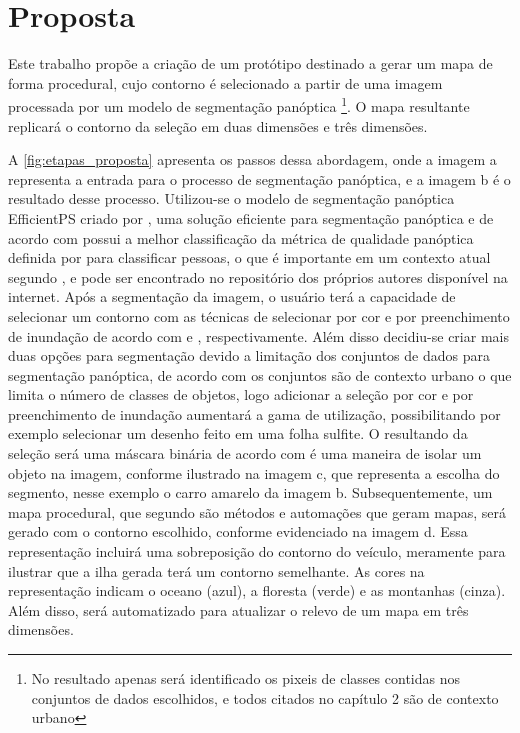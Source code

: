 \section{Proposta}

Este trabalho propõe a criação de um protótipo destinado a gerar um mapa de forma procedural, cujo contorno é selecionado a partir de uma imagem processada por um modelo de segmentação panóptica \footnote{No resultado apenas será identificado os pixeis de classes contidas nos conjuntos de dados escolhidos, e todos citados no capítulo 2 são de contexto urbano}. O mapa resultante replicará o contorno da seleção em duas dimensões e três dimensões.

A \cref{fig:etapas_proposta} apresenta os passos dessa abordagem, onde a imagem a representa a entrada para o processo de segmentação panóptica, e a imagem b é o resultado desse processo. Utilizou-se o modelo de segmentação panóptica EfficientPS criado por , uma solução eficiente para segmentação panóptica e de acordo com  possui a melhor classificação da métrica de qualidade panóptica definida por  para classificar pessoas, o que é importante em um contexto atual segundo , e pode ser encontrado no repositório dos próprios autores  disponível na internet. Após a segmentação da imagem, o usuário terá a capacidade de selecionar um contorno com as técnicas de selecionar por cor e por preenchimento de inundação de acordo com  e , respectivamente. Além disso decidiu-se criar mais duas opções para segmentação devido a limitação dos conjuntos de dados para segmentação panóptica, de acordo com  os conjuntos são de contexto urbano o que limita o número de classes de objetos, logo adicionar a seleção por cor e por preenchimento de inundação aumentará a gama de utilização, possibilitando por exemplo selecionar um desenho feito em uma folha sulfite.
O resultando da seleção será uma máscara binária de acordo com  é uma maneira de isolar um objeto na imagem, conforme ilustrado na imagem c, que representa a escolha do segmento, nesse exemplo o carro amarelo da imagem b. Subsequentemente, um mapa procedural, que segundo  são métodos e automações que geram mapas, será gerado com o contorno escolhido, conforme evidenciado na imagem d. Essa representação incluirá uma sobreposição do contorno do veículo, meramente para ilustrar que a ilha gerada terá um contorno semelhante. As cores na representação indicam o oceano (azul), a floresta (verde) e as montanhas (cinza). Além disso, será automatizado para atualizar o relevo de um mapa em três dimensões.
